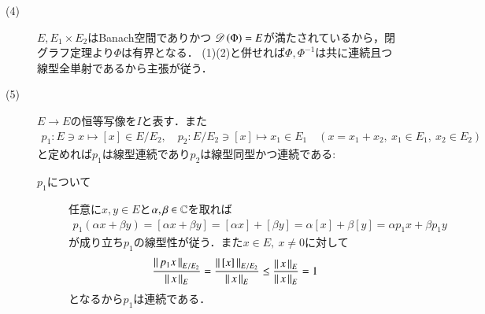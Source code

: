 \begin{prf}
\begin{description}
			\item[(4)] $E,E_1 \times E_2$はBanach空間でありかつ
				$\Dom{\Phi} = E$が満たされているから，閉グラフ定理より$\Phi$は有界となる．
				(1)(2)と併せれば$\Phi,\Phi^{-1}$は共に連続且つ線型全単射であるから主張が従う．
			
			\item[(5)] $E \rightarrow E$の恒等写像を$I$と表す．また
				\begin{align}
					p_1:E \ni x \longmapsto [x] \in E/E_2,
					\quad p_2:E/E_2 \ni [x] \longmapsto x_1 \in E_1 \quad (x = x_1 + x_2,\ x_1 \in E_1,\ x_2 \in E_2)
				\end{align}
				と定めれば$p_1$は線型連続であり$p_2$は線型同型かつ連続である:
				\begin{description}
					\item[$p_1$について] 任意に$x,y \in E$と$\alpha, \beta \in \mathbb{C}$を取れば
						\begin{align}
							p_1(\alpha x + \beta y) = [\alpha x + \beta y] = [\alpha x] + [\beta y] 
							= \alpha [x] + \beta [y] = \alpha p_1 x + \beta p_1 y
						\end{align}
						が成り立ち$p_1$の線型性が従う．また$x \in E,\ x \neq 0$に対して
						\begin{align}
							\frac{\left\|\, p_1 x\, \right\|_{E/E_2}}{\left\|\, x\, \right\|_{E}} = \frac{\left\|\, [x]\, \right\|_{E/E_2}}{\left\|\, x\, \right\|_{E}} \leq \frac{\left\|\, x\, \right\|_{E}}{\left\|\, x\, \right\|_{E}} = 1
						\end{align}
						となるから$p_1$は連続である．
						

\end{description}
\end{description}
\end{prf}
